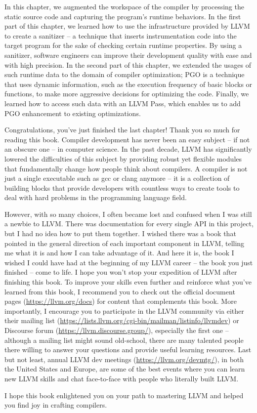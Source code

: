 In this chapter, we augmented the workspace of the compiler by processing the static source code and capturing the program's runtime behaviors. In the first part of this chapter, we learned how to use the infrastructure provided by LLVM to create a sanitizer – a technique that inserts instrumentation code into the target program for the sake of checking certain runtime properties. By using a sanitizer, software engineers can improve their development quality with ease and with high precision. In the second part of this chapter, we extended the usages of such runtime data to the domain of compiler optimization; PGO is a technique that uses dynamic information, such as the execution frequency of basic blocks or functions, to make more aggressive decisions for optimizing the code. Finally, we learned how to access such data with an LLVM Pass, which enables us to add PGO enhancement to existing optimizations.

Congratulations, you've just finished the last chapter! Thank you so much for reading this book. Compiler development has never been an easy subject – if not an obscure one – in computer science. In the past decade, LLVM has significantly lowered the difficulties of this subject by providing robust yet flexible modules that fundamentally change how people think about compilers. A compiler is not just a single executable such as gcc or clang anymore – it is a collection of building blocks that provide developers with countless ways to create tools to deal with hard problems in the programming language field.

However, with so many choices, I often became lost and confused when I was still a newbie to LLVM. There was documentation for every single API in this project, but I had no idea how to put them together. I wished there was a book that pointed in the general direction of each important component in LLVM, telling me what it is and how I can take advantage of it. And here it is, the book I wished I could have had at the beginning of my LLVM career – the book you just finished – come to life. I hope you won't stop your expedition of LLVM after finishing this book. To improve your skills even further and reinforce what you've learned from this book, I recommend you to check out the official document pages (\url{https://llvm.org/docs}) for content that complements this book. More importantly, I encourage you to participate in the LLVM community via either their mailing list (\url{https://lists.llvm.org/cgi-bin/mailman/listinfo/llvmdev}) or Discourse forum (\url{https://llvm.discourse.group/}), especially the first one – although a mailing list might sound old-school, there are many talented people there willing to answer your questions and provide useful learning resources. Last but not least, annual LLVM dev meetings (\url{https://llvm.org/devmtg/}), in both the United States and Europe, are some of the best events where you can learn new LLVM skills and chat face-to-face with people who literally built LLVM.

I hope this book enlightened you on your path to mastering LLVM and helped you find joy in crafting compilers.







